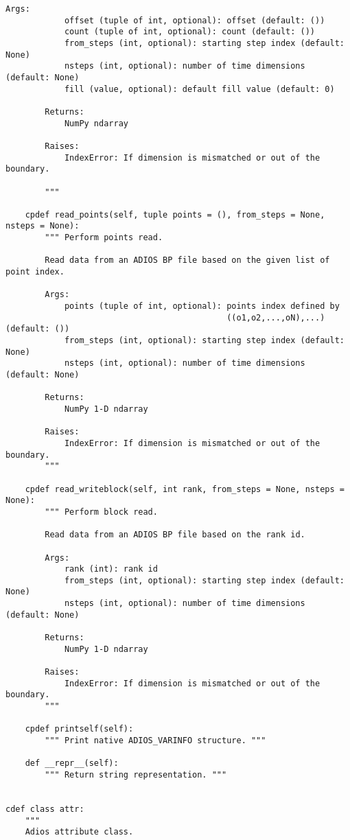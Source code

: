 \begin{lstlisting}[language=cython,caption={Read functions},label={},]
        Args:
            offset (tuple of int, optional): offset (default: ())
            count (tuple of int, optional): count (default: ())
            from_steps (int, optional): starting step index (default: None)
            nsteps (int, optional): number of time dimensions (default: None)
            fill (value, optional): default fill value (default: 0)

        Returns:
            NumPy ndarray
            
        Raises:
            IndexError: If dimension is mismatched or out of the boundary.

        """

    cpdef read_points(self, tuple points = (), from_steps = None, nsteps = None):
        """ Perform points read.

        Read data from an ADIOS BP file based on the given list of point index.

        Args:
            points (tuple of int, optional): points index defined by 
                                             ((o1,o2,...,oN),...) (default: ())
            from_steps (int, optional): starting step index (default: None)
            nsteps (int, optional): number of time dimensions (default: None)

        Returns:
            NumPy 1-D ndarray

        Raises:
            IndexError: If dimension is mismatched or out of the boundary.
        """

    cpdef read_writeblock(self, int rank, from_steps = None, nsteps = None):
        """ Perform block read.

        Read data from an ADIOS BP file based on the rank id.

        Args:
            rank (int): rank id
            from_steps (int, optional): starting step index (default: None)
            nsteps (int, optional): number of time dimensions (default: None)

        Returns:
            NumPy 1-D ndarray

        Raises:
            IndexError: If dimension is mismatched or out of the boundary.
        """

    cpdef printself(self):
        """ Print native ADIOS_VARINFO structure. """

    def __repr__(self):
        """ Return string representation. """
        

cdef class attr:
    """
    Adios attribute class.
    

\end{lstlisting}
